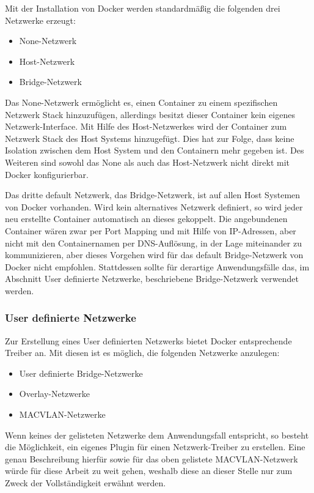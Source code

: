 Mit der Installation von Docker werden standardmäßig die folgenden drei Netzwerke erzeugt:

\begin{itemize}
	\item None-Netzwerk
	\item Host-Netzwerk
	\item Bridge-Netzwerk
\end{itemize}

Das None-Netzwerk ermöglicht es, einen Container zu einem spezifischen Netzwerk Stack hinzuzufügen, allerdings besitzt dieser Container kein eigenes Netzwerk-Interface. 
Mit Hilfe des Host-Netzwerkes wird der Container zum Netzwerk Stack des Host Systems hinzugefügt.
Dies hat zur Folge, dass keine Isolation zwischen dem Host System und den Containern mehr gegeben ist.
Des Weiteren sind sowohl das None als auch das Host-Netzwerk nicht direkt mit Docker konfigurierbar.

Das dritte default Netzwerk, das Bridge-Netzwerk, ist auf allen Host Systemen von Docker vorhanden.
Wird kein alternatives Netzwerk definiert, so wird jeder neu erstellte Container automatisch an dieses gekoppelt.
Die angebundenen Container wären zwar per Port Mapping und mit Hilfe von IP-Adressen, aber nicht mit den Containernamen per DNS-Auflösung, in der Lage miteinander zu kommunizieren, aber dieses Vorgehen wird für das default Bridge-Netzwerk von Docker nicht empfohlen.
Stattdessen sollte für derartige Anwendungsfälle das, im Abschnitt User definierte Netzwerke, beschriebene Bridge-Netzwerk verwendet werden.

\subsubsection{User definierte Netzwerke}

Zur Erstellung eines User definierten Netzwerks bietet Docker entsprechende Treiber an.
Mit diesen ist es möglich, die folgenden Netzwerke anzulegen:

\begin{itemize}
	\item User definierte Bridge-Netzwerke
	\item Overlay-Netzwerke
	\item MACVLAN-Netzwerke
\end{itemize}

Wenn keines der gelisteten Netzwerke dem Anwendungsfall entspricht, so besteht die Möglichkeit, ein eigenes Plugin für einen Netzwerk-Treiber zu erstellen.
Eine genau Beschreibung hierfür sowie für das oben gelistete MACVLAN-Netzwerk würde für diese Arbeit zu weit gehen, weshalb diese an dieser Stelle nur zum Zweck der Vollständigkeit erwähnt werden.

